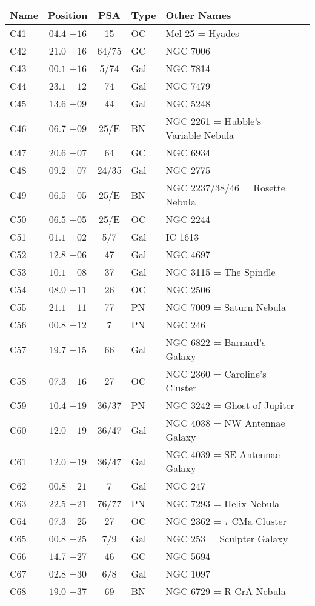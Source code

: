 \begin{table}[p]
\setlength{\tabcolsep}{3pt}
\small
\begin{tabular}{lcclll}
\hline
Name&Position&PSA&Type&Other Names\\
\hline
C41  &$04.4$ $+16$&15&OC &Mel 25 = Hyades\\
C42  &$21.0$ $+16$&64/75&GC &NGC 7006\\
C43  &$00.1$ $+16$&5/74&Gal&NGC 7814\\
C44  &$23.1$ $+12$&74&Gal&NGC 7479\\
C45  &$13.6$ $+09$&44&Gal&NGC 5248\\
C46  &$06.7$ $+09$&25/E&BN &NGC 2261 = Hubble's Variable Nebula\\
C47  &$20.6$ $+07$&64&GC &NGC 6934\\
C48  &$09.2$ $+07$&24/35&Gal&NGC 2775\\
C49  &$06.5$ $+05$&25/E&BN &NGC 2237/38/46 = Rosette Nebula\\
C50  &$06.5$ $+05$&25/E&OC &NGC 2244\\
C51  &$01.1$ $+02$&5/7&Gal&IC 1613\\
C52  &$12.8$ $-06$&47&Gal&NGC 4697\\
C53  &$10.1$ $-08$&37&Gal&NGC 3115 = The Spindle\\
C54  &$08.0$ $-11$&26&OC &NGC 2506\\
C55  &$21.1$ $-11$&77&PN &NGC 7009 = Saturn Nebula\\
C56  &$00.8$ $-12$&7&PN &NGC 246\\
C57  &$19.7$ $-15$&66&Gal&NGC 6822 = Barnard's Galaxy\\
C58  &$07.3$ $-16$&27&OC &NGC 2360 = Caroline's Cluster\\
C59  &$10.4$ $-19$&36/37&PN &NGC 3242 = Ghost of Jupiter\\
C60  &$12.0$ $-19$&36/47&Gal&NGC 4038 = NW Antennae Galaxy\\
C61  &$12.0$ $-19$&36/47&Gal&NGC 4039 = SE Antennae Galaxy\\
C62  &$00.8$ $-21$&7&Gal&NGC 247\\
C63  &$22.5$ $-21$&76/77&PN &NGC 7293 = Helix Nebula\\
C64  &$07.3$ $-25$&27&OC &NGC 2362 = $\tau$ CMa Cluster\\
C65  &$00.8$ $-25$&7/9&Gal&NGC 253 = Sculpter Galaxy\\
C66  &$14.7$ $-27$&46&GC &NGC 5694\\
C67  &$02.8$ $-30$&6/8&Gal&NGC 1097\\
C68  &$19.0$ $-37$&69&BN &NGC 6729 = R CrA Nebula\\

\end{tabular}
\end{table}
